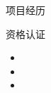 \documentclass[UTF8]{resume}
\begin{document}
\begin{rSection}{项目经历}

\end{rSection}

\begin{rSection}{资格认证}
    \begin{itemize}
        \itemsep -0.5em \vspace{-0.5em}
        \item{}
        \item{}
        \item{}
    \end{itemize}
\end{rSection}
\end{document}
